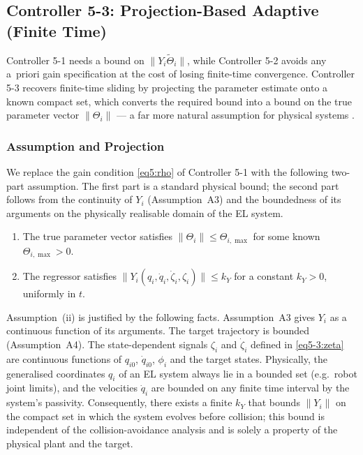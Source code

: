 \subsection{Controller 5-3: Projection-Based Adaptive (Finite Time)}
\label{sec: controller5-3}

Controller 5-1 needs a bound on $\|Y_i\tilde{\Theta}_i\|$, while Controller 5-2 avoids any
a~priori gain specification at the cost of losing finite-time convergence. Controller 5-3
recovers finite-time sliding by projecting the parameter estimate onto a known compact
set, which converts the required bound into a bound on the true parameter vector
$\|\Theta_i\|$ --- a far more natural assumption for physical systems
\cite{ioannouSunRobustAdaptiveControl1996}.

\subsubsection{Assumption and Projection}

We replace the gain condition \eqref{eq5:rho} of Controller 5-1 with the following
two-part assumption. The first part is a standard physical bound; the second part
follows from the continuity of $Y_i$ (Assumption~A3) and the boundedness of its
arguments on the physically realisable domain of the EL system.

\begin{assumption}
	\hfill
	\begin{enumerate}
		\item[(i)] The true parameter vector satisfies $\|\Theta_i\| \le \Theta_{i,\max}$
			for some known $\Theta_{i,\max} > 0$.
		\item[(ii)] The regressor satisfies $\|Y_i(q_i,\dot{q}_i,\dot{\zeta}_i,\zeta_i)\| \le k_Y$
			for a constant $k_Y > 0$, uniformly in $t$.
	\end{enumerate}
\end{assumption}

\noindent Assumption~(ii) is justified by the following facts.  Assumption~A3 gives
$Y_i$ as a continuous function of its arguments.  The target trajectory is bounded
(Assumption~A4).  The state-dependent signals $\zeta_i$ and $\dot{\zeta}_i$ defined in
\eqref{eq5-3:zeta} are continuous functions of $q_{i0}$, $\dot{q}_{i0}$, $\phi_i$ and the
target states.  Physically, the generalised coordinates $q_i$ of an EL system always
lie in a bounded set (e.g.~robot joint limits), and the velocities $\dot{q}_i$ are
bounded on any finite time interval by the system's passivity.  Consequently, there
exists a finite $k_Y$ that bounds $\|Y_i\|$ on the compact set in which the system
evolves before collision; this bound is independent of the collision-avoidance
analysis and is solely a property of the physical plant and the target.

